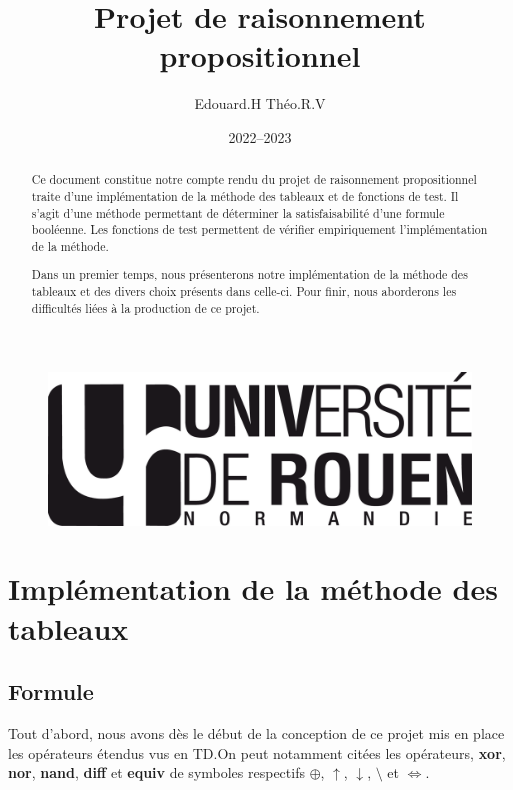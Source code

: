 \documentclass[12pt]{article}
\title{Projet de raisonnement propositionnel}
\author{Edouard.H Théo.R.V}
\date{2022--2023}
\begin{document}
    \begin{figure}
        \includegraphics[scale=0.3, right]{logo-univ-rouen-normandie-noir.png}
    \end{figure}

    \maketitle

    \begin{abstract}
        Ce document constitue notre compte rendu du projet de raisonnement
        propositionnel traite d'une implémentation de la méthode des 
        tableaux et de fonctions de test. Il s'agit d'une méthode permettant de 
        déterminer la satisfaisabilité d'une formule booléenne. Les fonctions de 
        test permettent de vérifier empiriquement l'implémentation de la méthode.  
        
        Dans un premier temps, nous présenterons notre implémentation de la 
        méthode des tableaux et des divers choix présents dans celle-ci. Pour 
        finir, nous aborderons les difficultés liées à la production de ce 
        projet.
    \end{abstract}

    \newpage

    \tableofcontents

    \newpage

    \section{Implémentation de la méthode des tableaux}

    \subsection{Formule}

    Tout d'abord, nous avons dès le début de la conception de ce projet mis en 
    place les opérateurs étendus vus en TD.\@ On peut notamment citées les 
    opérateurs, \textbf{xor}, \textbf{nor}, \textbf{nand}, \textbf{diff} et 
    \textbf{equiv} de symboles respectifs $\oplus$, $\uparrow$, $\downarrow$, 
    $\setminus$ et $\Leftrightarrow$. 
\end{document}
